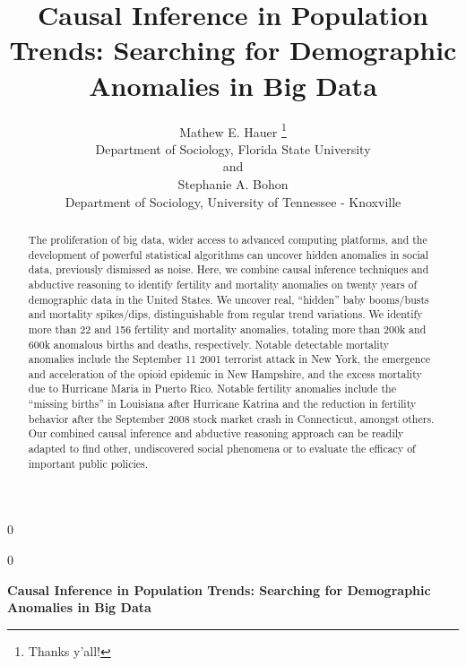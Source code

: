 \documentclass[12pt]{article}
\newcommand{\blind}{0}
\begin{document}
\def\spacingset#1{\renewcommand{\baselinestretch}%
{#1}\small\normalsize} \spacingset{1}



\blind
{
  \title{\bf Causal Inference in Population Trends: Searching for Demographic
Anomalies in Big Data}

  \author{
        Mathew E. Hauer \thanks{Thanks y'all!} \\
    Department of Sociology, Florida State University\\
     and \\     Stephanie A. Bohon \\
    Department of Sociology, University of Tennessee - Knoxville\\
      }
  \maketitle
} \fi

\blind
{
  \bigskip
  \bigskip
  \bigskip
  \begin{center}
    {\LARGE\bf Causal Inference in Population Trends: Searching for Demographic
Anomalies in Big Data}
  \end{center}
  \medskip
} \fi

\bigskip
\begin{abstract}
The proliferation of big data, wider access to advanced computing
platforms, and the development of powerful statistical algorithms can
uncover hidden anomalies in social data, previously dismissed as noise.
Here, we combine causal inference techniques and abductive reasoning to
identify fertility and mortality anomalies on twenty years of
demographic data in the United States. We uncover real, ``hidden'' baby
booms/busts and mortality spikes/dips, distinguishable from regular
trend variations. We identify more than 22 and 156 fertility and
mortality anomalies, totaling more than 200k and 600k anomalous births
and deaths, respectively. Notable detectable mortality anomalies include
the September 11 2001 terrorist attack in New York, the emergence and
acceleration of the opioid epidemic in New Hampshire, and the excess
mortality due to Hurricane Maria in Puerto Rico. Notable fertility
anomalies include the ``missing births'' in Louisiana after Hurricane
Katrina and the reduction in fertility behavior after the September 2008
stock market crash in Connecticut, amongst others. Our combined causal
inference and abductive reasoning approach can be readily adapted to
find other, undiscovered social phenomena or to evaluate the efficacy of
important public policies.
\end{abstract}
\end{document}
